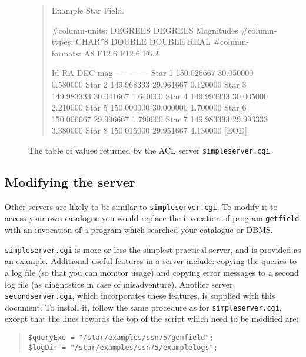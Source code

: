 \documentclass[twoside,11pt,nolof,chapters]{starlink}
\begin{document}
\begin{figure}[htbp]

\begin{quote}
\begin{terminalv}

Example Star Field.

#column-units:          DEGREES         DEGREES         Magnitudes
#column-types:   CHAR*8         DOUBLE  DOUBLE  REAL
#column-formats: A8     F12.6   F12.6   F6.2

Id      RA      DEC     mag
--      --      ---     ---
Star 1  150.026667      30.050000       0.580000
Star 2  149.968333      29.961667       0.120000
Star 3  149.983333      30.041667       1.640000
Star 4  149.993333      30.005000       2.210000
Star 5  150.000000      30.000000       1.700000
Star 6  150.006667      29.996667       1.790000
Star 7  149.983333      29.993333       3.380000
Star 8  150.015000      29.951667       4.130000
[EOD]
\end{terminalv}

\caption{The table of values returned by the ACL server \texttt{simpleserver.cgi}.
\label{SIMPLE_TST} }
\end{quote}

\end{figure}


\subsection{Modifying the server}

Other servers are likely to be similar to \texttt{simpleserver.cgi}.  To
modify it to access your own catalogue you would replace the invocation
of program \texttt{getfield} with an invocation of a program which searched
your catalogue or DBMS.

\texttt{simpleserver.cgi} is more-or-less the simplest practical server,
and is provided as an example.  Additional useful features in a server
include: copying the queries to a log file (so that you can monitor
usage) and copying error messages to a second log file (as diagnostics
in case of misadventure).  Another server, \texttt{secondserver.cgi}, which
incorporates these features, is supplied with this document.  To install
it, follow the same procedure as for \texttt{simpleserver.cgi}, except that
the lines towards the top of the script which need to be modified are:

  \begin{quote}
    \verb+$queryExe = "/star/examples/ssn75/genfield";+ \\
    \verb+$logDir = "/star/examples/ssn75/examplelogs";+
  \end{quote}
\end{document}
